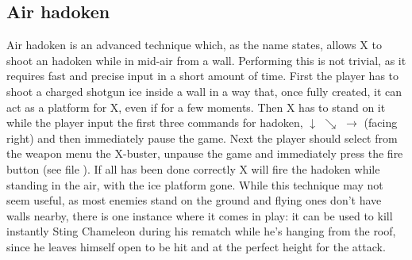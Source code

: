 \subsection{Air hadoken}
Air hadoken is an advanced technique which, as the name states, allows X to shoot an hadoken while in mid-air from a wall. Performing this is not trivial, as it requires fast and precise input in a short amount of time. First the player has to shoot a charged shotgun ice inside a wall in a way that, once fully created, it can act as a platform for X, even if for a few moments. Then X has to stand on it while the player input the first three commands for hadoken, $\downarrow$ $\searrow$ $\rightarrow$ (facing right) and then immediately pause the game. Next the player should select from the weapon menu the X-buster, unpause the game and immediately press the fire button (see file ). If all has been done correctly X will fire the hadoken while standing in the air, with the ice platform gone. While this technique may not seem useful, as most enemies stand on the ground and flying ones don't have walls nearby, there is one instance where it comes in play: it can be used to kill instantly Sting Chameleon during his rematch while he's hanging from the roof, since he leaves himself open to be hit and at the perfect height for the attack.

